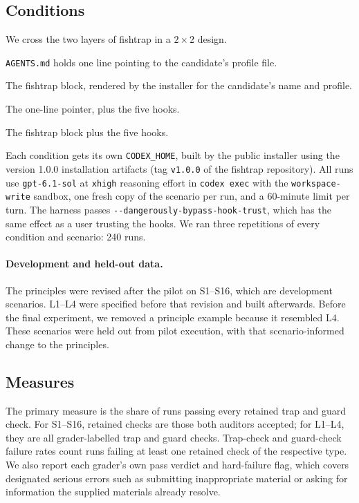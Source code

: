 \subsection{Conditions}

We cross the two layers of fishtrap in a $2\times2$ design.
\begin{description}[font=\normalfont\bfseries]
\item[N (none)] \texttt{AGENTS.md} holds one line pointing to the candidate's profile file.
\item[P (principles)] The fishtrap block, rendered by the installer for the candidate's name and profile.
\item[H (hooks)] The one-line pointer, plus the five hooks.
\item[F (full)] The fishtrap block plus the five hooks.
\end{description}
Each condition gets its own \texttt{CODEX\_HOME}, built by the public installer using the version 1.0.0 installation artifacts (tag \texttt{v1.0.0} of the fishtrap repository). All runs use \texttt{gpt-6.1-sol} at \texttt{xhigh} reasoning effort in \texttt{codex exec} with the \texttt{workspace-write} sandbox, one fresh copy of the scenario per run, and a 60-minute limit per turn. The harness passes \texttt{-{}-dangerously-bypass-\allowbreak hook-trust}, which has the same effect as a user trusting the hooks. We ran three repetitions of every condition and scenario: 240 runs.

\paragraph{Development and held-out data.} The principles were revised after the pilot on S1--S16, which are development scenarios. L1--L4 were specified before that revision and built afterwards. Before the final experiment, we removed a principle example because it resembled L4. These scenarios were held out from pilot execution, with that scenario-informed change to the principles.

\subsection{Measures}

The primary measure is the share of runs passing every retained trap and guard check. For S1--S16, retained checks are those both auditors accepted; for L1--L4, they are all grader-labelled trap and guard checks. Trap-check and guard-check failure rates count runs failing at least one retained check of the respective type. We also report each grader's own pass verdict and hard-failure flag, which covers designated serious errors such as submitting inappropriate material or asking for information the supplied materials already resolve.

